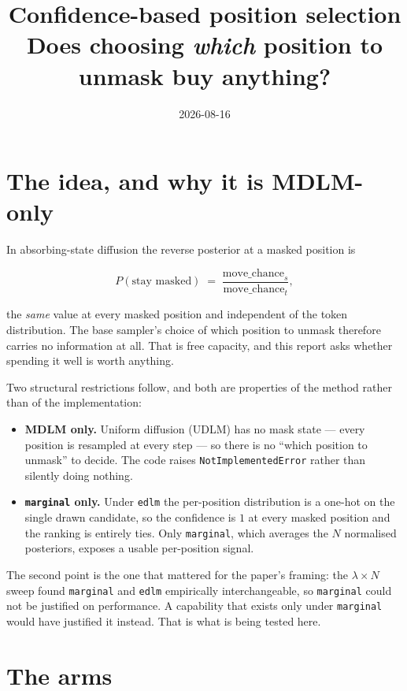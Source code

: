 \documentclass[11pt]{article}
\title{Confidence-based position selection\\\large Does choosing \emph{which} position to unmask buy anything?}
\author{}\date{2026-08-16}
\begin{document}
\maketitle
\section{The idea, and why it is MDLM-only}

In absorbing-state diffusion the reverse posterior at a masked position is

\[ P(\text{stay masked}) \;=\; \frac{\text{move\_chance}_s}{\text{move\_chance}_t}, \]

the \emph{same} value at every masked position and independent of the token
distribution. The base sampler's choice of which position to unmask therefore
carries no information at all. That is free capacity, and this report asks
whether spending it well is worth anything.

Two structural restrictions follow, and both are properties of the method rather
than of the implementation:

\begin{itemize}
  \item \textbf{MDLM only.} Uniform diffusion (UDLM) has no mask state --- every
        position is resampled at every step --- so there is no ``which position
        to unmask'' to decide. The code raises \texttt{NotImplementedError}
        rather than silently doing nothing.
  \item \textbf{\texttt{marginal} only.} Under \texttt{edlm} the per-position
        distribution is a one-hot on the single drawn candidate, so the
        confidence is $1$ at every masked position and the ranking is entirely
        ties. Only \texttt{marginal}, which averages the $N$ normalised
        posteriors, exposes a usable per-position signal.
\end{itemize}

The second point is the one that mattered for the paper's framing: the
$\lambda \times N$ sweep found \texttt{marginal} and \texttt{edlm} empirically
interchangeable, so \texttt{marginal} could not be justified on performance.
A capability that exists only under \texttt{marginal} would have justified it
instead. That is what is being tested here.

\section{The arms}
\end{document}
